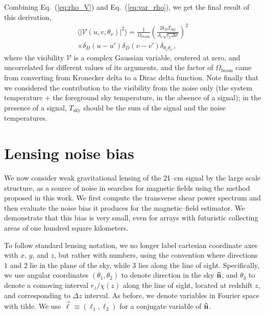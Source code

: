 \documentclass[aps,prd,twocolumn,floatfix,showpacs,superscriptaddress,nofootinbib]{revtex4-1}
\newcommand{\beq}{\begin{equation}}
\newcommand{\eeq}{\end{equation}}
\newcommand{\bga}{\begin{gathered}}
\newcommand{\ega}{\end{gathered}}
\begin{document}
Combining Eq.~(\ref{eq:rho_V}) and Eq.~(\ref{eq:var_rho}), we get the final result of this derivation,
\beq
\bga
\langle|\mathcal{V}(u,v,\theta_\nu)|^2\rangle 
=\frac{1}{\Omega_\text{beam}}\left(\frac{2k_BT_\text{sky}}{A_e\sqrt{t_1\Delta \nu}}\right)^2\\
\times\delta_D(u-u')\delta_D(v-v')\delta_{\theta_\nu\theta_{\nu'}},
\ega
\label{eq:Vrms_final}
\eeq
where the visibility $\mathcal{V}$ is a complex Gaussian variable, centered at zero, and uncorrelated for different values of its arguments, and the factor of $\Omega_\text{beam}$ came from converting from Kronecker delta to a  Dirac delta function. Note finally that we considered the contribution to the visibility from the noise only (the system temperature + the foreground sky temperature, in the absence of a signal); in the presence of a signal, $T_\text{sky}$ should be the sum of the signal and the noise temperatures.
 
\section{Lensing noise bias}
\label{app:lensing}
We now consider weak gravitational lensing of the 21--cm signal by the large scale structure, as a source of noise in searches for magnetic fields using the method proposed in this work. We first compute the transverse shear power spectrum and then evaluate the noise bias it produces for the magnetic--field estimator. We demonstrate that this bias is very small, even for arrays with futuristic collecting areas of one hundred square kilometers.

To follow standard lensing notation, we no longer label cartesian coordinate axes with $x$, $y$, and $z$, but rather with numbers, using the convention where directions $1$ and $2$ lie in the plane of the sky, while $3$ lies along the line of sight. Specifically, we use angular coordinates $(\theta_1, \theta_2)$ to denote direction in the sky ${\bf{\widehat n}}$, and $\theta_3$ to denote a comoving interval $r_z/\chi(z)$ along the line of sight, located at redshift $z$, and corresponding to $\Delta z$ interval. As before, we denote variables in Fourier space with tilde. We use $\vec{\ell}\equiv(\ell_1,\ell_2)$ for a conjugate variable of ${\bf{\widehat n}}$. 
 
\end{document}
